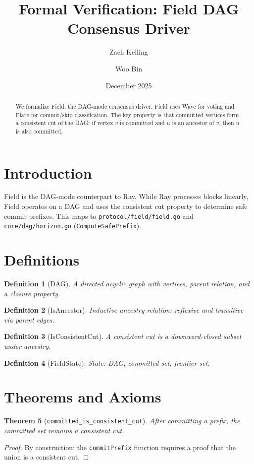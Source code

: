 \documentclass[11pt]{article}
\title{Formal Verification: Field DAG Consensus Driver}
\author{Zach Kelling \and Woo Bin}
\date{December 2025}
\newtheorem{theorem}{Theorem}
\newtheorem{definition}[theorem]{Definition}
\begin{document}
\maketitle

\begin{abstract}
We formalize Field, the DAG-mode consensus driver. Field uses Wave for voting and Flare for commit/skip classification. The key property is that committed vertices form a consistent cut of the DAG: if vertex $v$ is committed and $u$ is an ancestor of $v$, then $u$ is also committed.
\end{abstract}

\section{Introduction}
Field is the DAG-mode counterpart to Ray. While Ray processes blocks linearly, Field operates on a DAG and uses the consistent cut property to determine safe commit prefixes. This maps to \texttt{protocol/field/field.go} and \texttt{core/dag/horizon.go} (\texttt{ComputeSafePrefix}).

\section{Definitions}
\begin{definition}[DAG]
A directed acyclic graph with vertices, parent relation, and a closure property.
\end{definition}

\begin{definition}[IsAncestor]
Inductive ancestry relation: reflexive and transitive via parent edges.
\end{definition}

\begin{definition}[IsConsistentCut]
A consistent cut is a downward-closed subset under ancestry.
\end{definition}

\begin{definition}[FieldState]
State: DAG, committed set, frontier set.
\end{definition}


\section{Theorems and Axioms}
\begin{theorem}[\texttt{committed\_is\_consistent\_cut}]
After committing a prefix, the committed set remains a consistent cut.
\end{theorem}
\begin{proof}
By construction: the \texttt{commitPrefix} function requires a proof that the union is a consistent cut.
\end{proof}
\end{document}
